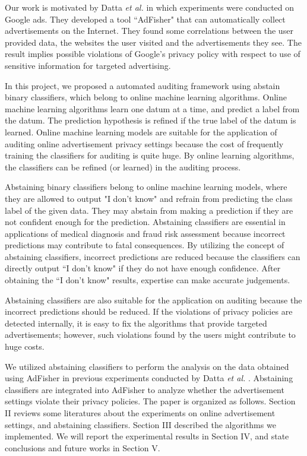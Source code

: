 \documentclass[12pt, journal]{IEEEtran}
\begin{document}
Our work is motivated by Datta \textit{et al.} \cite{datta} in which experiments were conducted on Google ads. They developed a tool ``AdFisher" that  can automatically collect advertisements on the Internet. They found some correlations between the user provided data, the websites the user visited and the advertisements they see. The result implies possible violations of Google's privacy policy with respect to use of sensitive information for targeted advertising. 
 
 
In this project, we proposed a automated auditing framework using abstain binary classifiers, which belong to online machine learning algorithms.
Online machine learning algorithms learn one datum at a time, and predict a label from the datum.
The prediction hypothesis is refined if the true label of the datum is learned.
Online machine learning models are suitable for the application of auditing online advertisement privacy settings because the cost of frequently training the classifiers for auditing is quite huge.
By online learning algorithms, the classifiers can be refined (or learned) in the auditing process.
 
Abstaining binary classifiers belong to online machine learning models, where they are allowed to output "I don't know" and refrain from predicting the class label of the given data.
They may abstain from making a prediction if they are not confident enough for the prediction. 
Abstaining classifiers are essential in applications of medical diagnosis and fraud risk assessment because incorrect predictions may contribute to fatal consequences\cite{akshay}.
By utilizing the concept of abstaining classifiers, incorrect predictions are reduced because the classifiers can directly output ``I don't know" if they do not have enough confidence.
After obtaining the ``I don't know" results, expertise can make accurate judgements.

Abstaining classifiers are also suitable for the application on auditing because the incorrect predictions should be reduced.
If the violations of privacy policies are detected internally, it is easy to fix the algorithms that provide targeted advertisements; however, such violations found by the users might contribute to huge costs.

We utilized abstaining classifiers to perform the analysis on the data obtained using AdFisher in previous experiments conducted by Datta \textit{et al.} \cite{datta}.
Abstaining classifiers are integrated into AdFisher to analyze whether the advertisement settings violate their privacy policies.
The paper is organized as follows. Section II reviews some literatures about the experiments on online advertisement settings, and abstaining classifiers. 
Section III described the algorithms we implemented.
We will report the experimental results in Section IV, and state conclusions and future works in Section V.   
\end{document}
